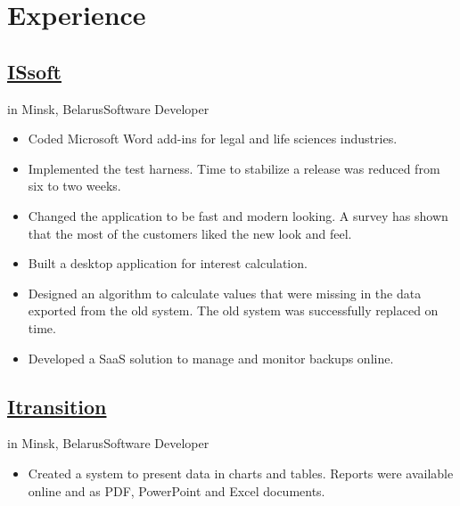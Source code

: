 \documentclass[a4paper,11pt]{article}
\newcommand{\minsk}{Minsk, Belarus}
\newcommand{\periodinminsk}[1]{{\footnotesize #1 in \minsk}}
\newcommand{\jobattributes}[1]{\periodinminsk{#1}{\footnotesize \newline Software Developer}}
\begin{document}
  \begin{minipage}[t]{0.55\textwidth}
    \section*{Experience}
    \subsection*{\href{http://www.issoft.by/}{ISsoft}}
    \jobattributes{}
    \begin{itemize}
      \item Coded Microsoft Word add-ins for legal and life sciences industries.
      \item Implemented the test harness. Time to stabilize a release was reduced from six to two weeks.
      \item Changed the application to be fast and modern looking. A survey has shown that the most of the customers liked the new look and feel.
      \item Built a desktop application for interest calculation.
      \item Designed an algorithm to calculate values that were missing in the data exported from the old system. The old system was successfully replaced on time.
      \item Developed a SaaS solution to manage and monitor backups online.
    \end{itemize}
    \subsection*{\href{http://www.itransition.com/}{Itransition}}
    \jobattributes{}
    \begin{itemize}
      \item Created a system to present data in charts and tables. Reports were available online and as PDF, PowerPoint and Excel documents.
    \end{itemize}
  \end{minipage}
\end{document}
